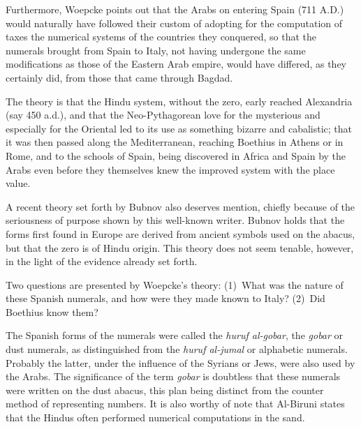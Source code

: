 \documentclass[11pt,a4paper]{article}
\begin{document}
Furthermore, Woepcke points out that the Arabs on entering Spain (711 A.D.) would naturally have followed their custom of adopting for the computation of taxes the numerical systems of the countries they conquered, so that the numerals brought from Spain to Italy, not having undergone the same modifications as those of the Eastern Arab empire, would have differed, as they certainly did, from those that came through Bagdad.

The theory is that the Hindu system, without the zero, early reached Alexandria (say 450 a.d.), and that the Neo-Pythagorean love for the mysterious and especially for the Oriental led to its use as something bizarre and cabalistic; that it was then passed along the Mediterranean, reaching Boethius in Athens or in Rome, and to the schools of Spain, being discovered in Africa and Spain by the Arabs even before they themselves knew the improved system with the place value.

A recent theory set forth by Bubnov also deserves mention, chiefly because of the seriousness of purpose shown by this well-known writer. Bubnov holds that the forms first found in Europe are derived from ancient symbols used on the abacus, but that the zero is of Hindu origin. This theory does not seem tenable, however, in the light of the evidence already set forth.

Two questions are presented by Woepcke's theory: (1)~What was the nature of these Spanish numerals, and how were they made known to Italy? (2)~Did Boethius know them?

The Spanish forms of the numerals were called the \textit{huruf al-gobar}, the \textit{gobar} or dust numerals, as distinguished from the \textit{huruf al-jumal} or alphabetic numerals. Probably the latter, under the influence of the Syrians or Jews, were also used by the Arabs. The significance of the term \textit{gobar} is doubtless that these numerals were written on the dust abacus, this plan being distinct from the counter method of representing numbers. It is also worthy of note that Al-Biruni states that the Hindus often performed numerical computations in the sand.
\end{document}
